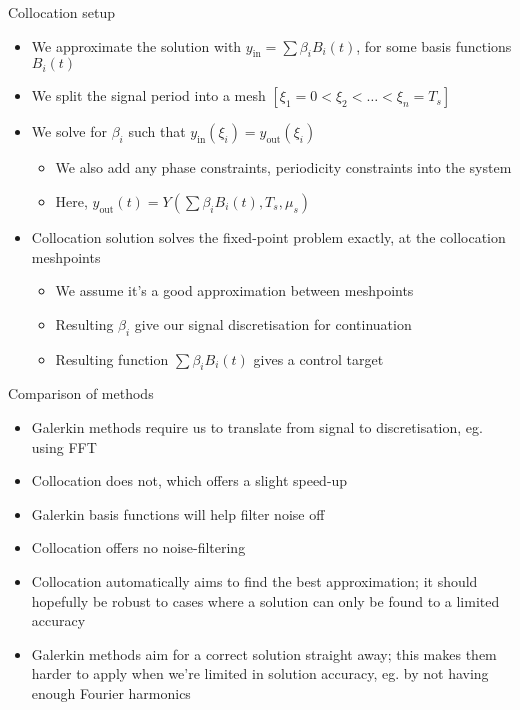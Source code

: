 \documentclass[presentation]{beamer}
\begin{document}
\begin{frame}[label={sec:org50baf68}]{Collocation setup}
\begin{itemize}
\item We approximate the solution with \(y_\text{in} = \sum \beta_i B_i(t)\), for some basis functions \(B_i(t)\)
\end{itemize}
\vfill
\begin{itemize}
\item We split the signal period into a mesh \(\left[\xi_1=0 < \xi_2 < \dots < \xi_{n}=T_s\right]\)
\end{itemize}
\vfill
\begin{itemize}
\item We solve for \(\beta_i\) such that \(y_\text{in}(\xi_i) = y_\text{out}(\xi_i)\)
\begin{itemize}
\item We also add any phase constraints, periodicity constraints into the system
\item Here, \(y_\text{out}(t) = Y(\sum\beta_iB_i(t), T_s, \mu_s)\)
\end{itemize}
\end{itemize}
\vfill
\begin{itemize}
\item Collocation solution solves the fixed-point problem exactly, at the collocation meshpoints
\begin{itemize}
\item We assume it's a good approximation between meshpoints
\item Resulting \(\beta_i\) give our signal discretisation for continuation
\item Resulting function \(\sum\beta_i B_i(t)\) gives a control target
\end{itemize}
\end{itemize}
\end{frame}

\begin{frame}[label={sec:orgf31c4a6}]{Comparison of methods}
\begin{itemize}
\item Galerkin methods require us to translate from signal to discretisation, eg. using FFT
\item Collocation does not, which offers a slight speed-up
\end{itemize}
\vfill
\begin{itemize}
\item Galerkin basis functions will help filter noise off
\item Collocation offers no noise-filtering
\end{itemize}
\vfill
\begin{itemize}
\item Collocation automatically aims to find the best approximation; it should hopefully be robust to cases where a solution can only be found to a limited accuracy
\item Galerkin methods aim for a correct solution straight away; this makes them harder to apply when we're limited in solution accuracy, eg. by not having enough Fourier harmonics
\end{itemize}
\end{frame}
\end{document}

